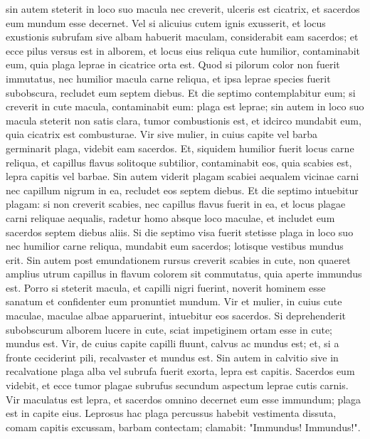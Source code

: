 \begin{biblechapter}
\verse sin autem steterit in loco suo macula nec creverit, ulceris est cicatrix, et sacerdos eum mundum esse decernet. 
\verse Vel si alicuius cutem ignis exusserit, et locus exustionis subrufam sive albam habuerit maculam, 
\verse considerabit eam sacerdos; et ecce pilus versus est in alborem, et locus eius reliqua cute humilior, contaminabit eum, quia plaga leprae in cicatrice orta est. 
\verse Quod si pilorum color non fuerit immutatus, nec humilior macula carne reliqua, et ipsa leprae species fuerit subobscura, recludet eum septem diebus. 
\verse Et die septimo contemplabitur eum; si creverit in cute macula, contaminabit eum: plaga est leprae; 
\verse sin autem in loco suo macula steterit non satis clara, tumor combustionis est, et idcirco mundabit eum, quia cicatrix est combusturae. 
\verse Vir sive mulier, in cuius capite vel barba germinarit plaga, videbit eam sacerdos. 
\verse Et, siquidem humilior fuerit locus carne reliqua, et capillus flavus solitoque subtilior, contaminabit eos, quia scabies est, lepra capitis vel barbae. 
\verse Sin autem viderit plagam scabiei aequalem vicinae carni nec capillum nigrum in ea, recludet eos septem diebus. 
\verse Et die septimo intuebitur plagam: si non creverit scabies, nec capillus flavus fuerit in ea, et locus plagae carni reliquae aequalis, 
\verse radetur homo absque loco maculae, et includet eum sacerdos septem diebus aliis. 
\verse Si die septimo visa fuerit stetisse plaga in loco suo nec humilior carne reliqua, mundabit eum sacerdos; lotisque vestibus mundus erit. 
\verse Sin autem post emundationem rursus creverit scabies in cute, 
\verse non quaeret amplius utrum capillus in flavum colorem sit commutatus, quia aperte immundus est. 
\verse Porro si steterit macula, et capilli nigri fuerint, noverit hominem esse sanatum et confidenter eum pronuntiet mundum. 
\verse Vir et mulier, in cuius cute maculae, maculae albae apparuerint, 
\verse intuebitur eos sacerdos. Si deprehenderit subobscurum alborem lucere in cute, sciat impetiginem ortam esse in cute; mundus est. 
\verse Vir, de cuius capite capilli fluunt, calvus ac mundus est; 
\verse et, si a fronte ceciderint pili, recalvaster et mundus est. 
\verse Sin autem in calvitio sive in recalvatione plaga alba vel subrufa fuerit exorta, lepra est capitis.  
\verse Sacerdos eum videbit, et ecce tumor plagae subrufus secundum aspectum leprae cutis carnis. 
\verse Vir maculatus est lepra, et sacerdos omnino decernet eum esse immundum; plaga est in capite eius. 
\verse Leprosus hac plaga percussus habebit vestimenta dissuta, comam capitis excussam, barbam contectam; clamabit: "Immundus! Immundus!". 

\end{biblechapter}
